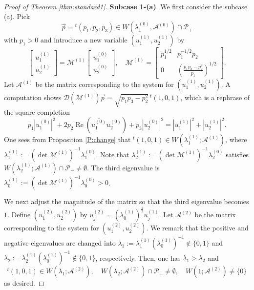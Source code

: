 \documentclass[11pt,a4paper,twosides]{amsart}
\theoremstyle{plain}
\theoremstyle{remark}
\numberwithin{equation}{section}
\renewcommand{\Im}{\operatorname{Im}}
\renewcommand{\Re}{\operatorname{Re}}
\theoremstyle{definition}
\newcommand{\1}{{\bf 1}_{\{|x| < |t|\}}}
\begin{document}
\begin{proof}[Proof of Theorem \ref{thm:standard1}]
{\bf Subcase 1-(a)}.
We first consider the subcase (a).
Pick
\[
	\vec{p} = {}^t\!( p_{1} ,
	p_{2} , p_{3})
\in W(\lambda_1^{(0)},\mathscr{A}^{(0)}) \cap \mathcal{P}_+
\]
with $p_{1}>0$ and
 introduce a new variable $(u_1^{(1)},u_2^{(1)})$ by
\[
	\begin{bmatrix}
	u_1^{(1)}\\
	u_2^{(1)}
	\end{bmatrix}
	=
	\mathscr{M}^{(1)}
	\begin{bmatrix}
	u_1^{(0)}\\
	u_2^{(0)}
	\end{bmatrix}, \quad
	\mathscr{M}^{(1)}=\begin{bmatrix}
	p_{1}^{1/2} & p_{1}^{-1/2}p_{2} \\
	0 & (\tfrac{p_{1}p_{3}-p_{2}^2}{p_{1}})^{1/2}
	\end{bmatrix}.
\]
Let $\mathscr{A}^{(1)}$ be the matrix corresponding to the system 
for $(u_1^{(1)},u_2^{(1)})$. 
A computation shows 
$\mathscr{D}(\mathscr{M}^{(1)}) \vec{p}=
\sqrt{p_1p_3-p_2^2}\ {}^t\!(1,0,1)$, which is a rephrase of the square completion
\[
	p_{1}|u_1^{(0)}|^2 + 2 p_{2} \Re (\overline{u_1^{(0)}}u_2^{(0)}) + p_{3} |u_2^{(0)}|^2 =
	|u_1^{(1)}|^2 + |u_2^{(1)} |^2.
\]
One sees from Proposition \ref{P:change} that 
${}^t\!(1,0,1) \in W(\lambda_1^{(1)};\mathscr{A}^{(1)})$,
where
$\lambda_1^{(1)}:=(\det \mathscr{M}^{(1)})^{-1} \lambda_1^{(0)}$.
Note that $\lambda_2^{(1)}:=(\det \mathscr{M}^{(1)})^{-1} \lambda_2^{(0)}$ satisfies $W(\lambda_2^{(1)};\mathscr{A}^{(1)}) \cap \mathcal{P}_+ \neq \emptyset$.
The third eigenvalue is $\lambda_0^{(1)}:=(\det \mathscr{M}^{(1)})^{-1} \lambda_0^{(0)}>0$.

We next adjust the magnitude of the matrix so that the third eigenvalue becomes $1$.
Define $(u_1^{(2)},u_2^{(2)})$ by
$u_j^{(2)}=(\lambda_0^{(1)})^{\frac12}u_j^{(1)}$.
Let $\mathscr{A}^{(2)}$ be the matrix corresponding to the system for $(u_1^{(2)},u_2^{(2)})$. 
We remark that the positive and negative eigenvalues are 
changed into $\lambda_1:=\lambda_1^{(1)}(\lambda_0^{(1)})^{-1}\not\in \{0,1\}$ and $\lambda_2:=\lambda_2^{(1)}(\lambda_0^{(1)})^{-1}\not\in \{0,1\}$, respectively.
Then, one has $\lambda_1>\lambda_2$ and 
\[
	{}^t\!(1,0,1) \in W(\lambda_1;\mathscr{A}^{(2)}), \quad
	W(\lambda_2;\mathscr{A}^{(2)}) \cap \mathcal{P}_+ \neq \emptyset, \quad
	W(1;\mathscr{A}^{(2)}) \neq \{0\}
\]
as desired.


\end{proof}
\end{document}
